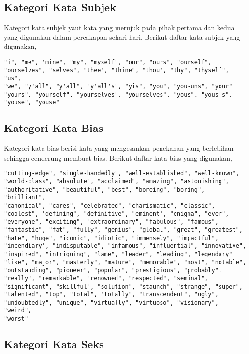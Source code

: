 \subsection{Kategori Kata Subjek}
\label{appendix:words_pronoun}

Kategori kata subjek yaut kata yang merujuk pada pihak pertama dan kedua yang
digunakan dalam percakapan sehari-hari.
Berikut daftar kata subjek yang digunakan,

\begin{lstlisting}
"i", "me", "mine", "my", "myself", "our", "ours", "ourself",
"ourselves", "selves", "thee", "thine", "thou", "thy", "thyself", "us",
"we", "y'all", "y'all", "y'all's", "yis", "you", "you-uns", "your",
"yours", "yourself", "yourselves", "yourselves", "yous", "yous's",
"youse", "youse"
\end{lstlisting}


\subsection{Kategori Kata Bias}
\label{appendix:words_bias}

Kategori kata bias berisi kata yang mengesankan penekanan yang berlebihan
sehingga cenderung membuat bias.
Berikut daftar kata bias yang digunakan,

\begin{lstlisting}
"cutting-edge", "single-handedly", "well-established", "well-known",
"world-class", "absolute", "acclaimed", "amazing", "astonishing",
"authoritative", "beautiful", "best", "boreing", "boring", "brilliant",
"canonical", "cares", "celebrated", "charismatic", "classic",
"coolest", "defining", "definitive", "eminent", "enigma", "ever",
"everyone", "exciting", "extraordinary", "fabulous", "famous",
"fantastic", "fat", "fully", "genius", "global", "great", "greatest",
"hate", "huge", "iconic", "idiotic", "immensely", "impactful",
"incendiary", "indisputable", "infamous", "influential", "innovative",
"inspired", "intriguing", "lame", "leader", "leading", "legendary",
"like", "major", "masterly", "mature", "memorable", "most", "notable",
"outstanding", "pioneer", "popular", "prestigious", "probably",
"really", "remarkable", "renowned", "respected", "seminal",
"significant", "skillful", "solution", "staunch", "strange", "super",
"talented", "top", "total", "totally", "transcendent", "ugly",
"undoubtedly", "unique", "virtually", "virtuoso", "visionary", "weird",
"worst"
\end{lstlisting}

\subsection{Kategori Kata Seks}
\label{appendix:words_sex}

